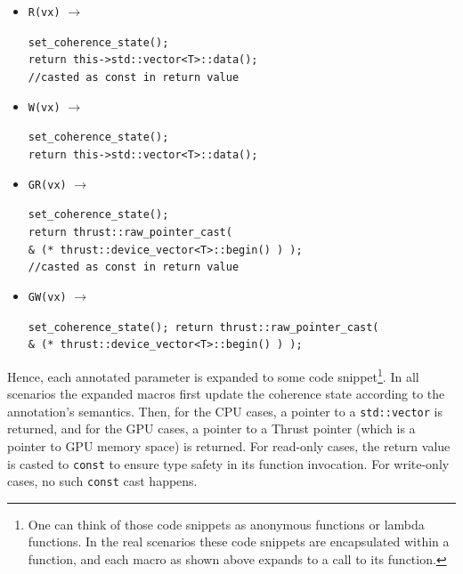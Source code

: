 \begin{small}
\begin{itemize}
 \item \texttt{R(vx)} $\longrightarrow$ 
 \begin{minipage}[t]{0.8\textwidth}
  \texttt{set\_coherence\_state();}\\
  \texttt{return this->std::vector<T>::data();}\\
  \texttt{//casted as const in return value}
 \end{minipage}
 \item \texttt{W(vx)} $\longrightarrow$ 
 \begin{minipage}[t]{0.8\textwidth} \texttt{set\_coherence\_state();}\\
 \texttt{return this->std::vector<T>::data();}
 \end{minipage}
 \item \texttt{GR(vx)} $\longrightarrow$ \begin{minipage}[t]{0.8\textwidth}
 \texttt{set\_coherence\_state();}\\
 \texttt{return thrust::raw\_pointer\_cast(}\\
 \hspace*{1em}\texttt{\& (* thrust::device\_vector<T>::begin() ) );}\\
 \texttt{//casted as const in return value}
 \end{minipage}
 \item \texttt{GW(vx)} $\longrightarrow$ 
\begin{minipage}[t]{0.8\textwidth} \texttt{set\_coherence\_state(); return thrust::raw\_pointer\_cast(}\\
\hspace*{1em}\texttt{\& (* thrust::device\_vector<T>::begin() ) );}
\end{minipage}
\end{itemize}
\end{small}

Hence, each annotated parameter is expanded to some code snippet\footnote{One can think of those code snippets as
anonymous functions or lambda functions. 
In the real scenarios these code snippets are encapsulated within a function,
and each macro as shown above expands to a call to its function.}.
In all scenarios the expanded macros first update the coherence state according to the annotation's semantics.
Then, for the CPU cases, a pointer to a \texttt{std::vector} is returned,
and for the GPU cases, a pointer to a Thrust pointer (which is a pointer to GPU memory space) is returned.
For read-only cases, the return value is casted to \texttt{const} to ensure type safety in its function invocation.
For write-only cases, no such \texttt{const} cast happens.

